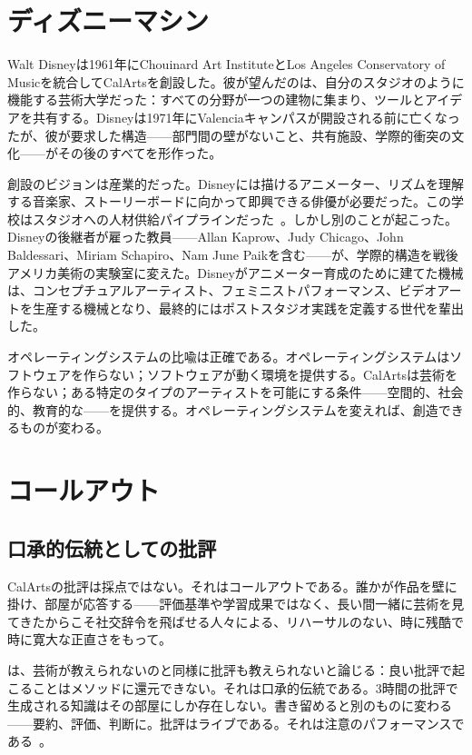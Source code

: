 \documentclass[10pt,letterpaper,twocolumn]{article}
\begin{document}
\section{ディズニーマシン}

Walt Disneyは1961年にChouinard Art InstituteとLos Angeles Conservatory of Musicを統合してCalArtsを創設した。彼が望んだのは、自分のスタジオのように機能する芸術大学だった：すべての分野が一つの建物に集まり、ツールとアイデアを共有する。Disneyは1971年にValenciaキャンパスが開設される前に亡くなったが、彼が要求した構造——部門間の壁がないこと、共有施設、学際的衝突の文化——がその後のすべてを形作った。

創設のビジョンは産業的だった。Disneyには描けるアニメーター、リズムを理解する音楽家、ストーリーボードに向かって即興できる俳優が必要だった。この学校はスタジオへの人材供給パイプラインだった~\citep{singerman1999art}。しかし別のことが起こった。Disneyの後継者が雇った教員——Allan Kaprow、Judy Chicago、John Baldessari、Miriam Schapiro、Nam June Paikを含む——が、学際的構造を戦後アメリカ美術の実験室に変えた。Disneyがアニメーター育成のために建てた機械は、コンセプチュアルアーティスト、フェミニストパフォーマンス、ビデオアートを生産する機械となり、最終的にはポストスタジオ実践を定義する世代を輩出した。

オペレーティングシステムの比喩は正確である。オペレーティングシステムはソフトウェアを作らない；ソフトウェアが動く環境を提供する。CalArtsは芸術を作らない；ある特定のタイプのアーティストを可能にする条件——空間的、社会的、教育的な——を提供する。オペレーティングシステムを変えれば、創造できるものが変わる。

\section{コールアウト}

\subsection{口承的伝統としての批評}

CalArtsの批評は採点ではない。それはコールアウトである。誰かが作品を壁に掛け、部屋が応答する——評価基準や学習成果ではなく、長い間一緒に芸術を見てきたからこそ社交辞令を飛ばせる人々による、リハーサルのない、時に残酷で時に寛大な正直さをもって。

\citet{elkins2001why}は、芸術が教えられないのと同様に批評も教えられないと論じる：良い批評で起こることはメソッドに還元できない。それは口承的伝統である。3時間の批評で生成される知識はその部屋にしか存在しない。書き留めると別のものに変わる——要約、評価、判断に。批評はライブである。それは注意のパフォーマンスである~\citep{hooks1994teaching}。
\end{document}
